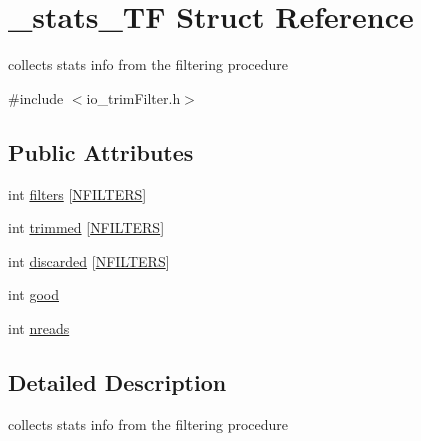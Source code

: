 \hypertarget{struct__stats__TF}{\section{\+\_\+stats\+\_\+\+T\+F Struct Reference}
\label{struct__stats__TF}
}


collects stats info from the filtering procedure  




{\ttfamily \#include $<$io\+\_\+trim\+Filter.\+h$>$}

\subsection*{Public Attributes}
\begin{DoxyCompactItemize}
\item 
int \hyperlink{struct__stats__TF_a47d4caef2878e2c10e7571cfdd2d9619}{filters} \mbox{[}\hyperlink{defines_8h_a23f1103d8247781ab0be4b0fba2f085f}{N\+F\+I\+L\+T\+E\+R\+S}\mbox{]}
\item 
int \hyperlink{struct__stats__TF_a399de2eb5fd452f019d5c8d23bae0651}{trimmed} \mbox{[}\hyperlink{defines_8h_a23f1103d8247781ab0be4b0fba2f085f}{N\+F\+I\+L\+T\+E\+R\+S}\mbox{]}
\item 
int \hyperlink{struct__stats__TF_a876a430dbbb78e3b03f9e7088da26618}{discarded} \mbox{[}\hyperlink{defines_8h_a23f1103d8247781ab0be4b0fba2f085f}{N\+F\+I\+L\+T\+E\+R\+S}\mbox{]}
\item 
int \hyperlink{struct__stats__TF_a4d36ddc878d561051a0f9464df2e0911}{good}
\item 
int \hyperlink{struct__stats__TF_a2a3993588191eb9f03416cce4fb1862f}{nreads}
\end{DoxyCompactItemize}


\subsection{Detailed Description}
collects stats info from the filtering procedure 

